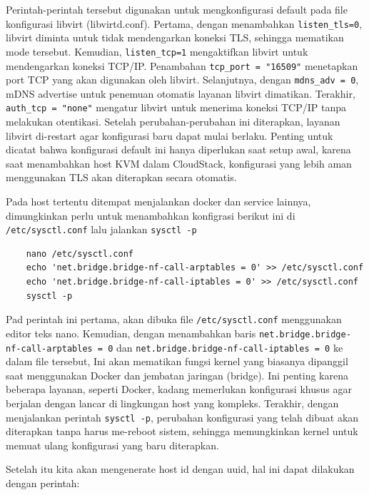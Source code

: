Perintah-perintah tersebut digunakan untuk mengkonfigurasi default pada file konfigurasi libvirt (libvirtd.conf). Pertama, dengan menambahkan \texttt{listen\_tls=0}, libvirt diminta untuk tidak mendengarkan koneksi TLS, sehingga mematikan mode tersebut. Kemudian, \texttt{listen\_tcp=1} mengaktifkan libvirt untuk mendengarkan koneksi TCP/IP. Penambahan \texttt{tcp\_port = "16509"} menetapkan port TCP yang akan digunakan oleh libvirt. Selanjutnya, dengan \texttt{mdns\_adv = 0}, mDNS advertise untuk penemuan otomatis layanan libvirt dimatikan. Terakhir, \texttt{auth\_tcp = "none"} mengatur libvirt untuk menerima koneksi TCP/IP tanpa melakukan otentikasi. Setelah perubahan-perubahan ini diterapkan, layanan libvirt di-restart agar konfigurasi baru dapat mulai berlaku. Penting untuk dicatat bahwa konfigurasi default ini hanya diperlukan saat setup awal, karena saat menambahkan host KVM dalam CloudStack, konfigurasi yang lebih aman menggunakan TLS akan diterapkan secara otomatis.

Pada host tertentu ditempat menjalankan docker dan service lainnya, dimungkinkan perlu untuk menambahkan konfigrasi berikut ini di \texttt{/etc/sysctl.conf} lalu jalankan \texttt{sysctl -p}

\begin{listing}[H]
    \begin{verbatim}
    nano /etc/sysctl.conf
    echo 'net.bridge.bridge-nf-call-arptables = 0' >> /etc/sysctl.conf
    echo 'net.bridge.bridge-nf-call-iptables = 0' >> /etc/sysctl.conf
    sysctl -p
    \end{verbatim}
\end{listing}

Pad perintah ini pertama, akan dibuka file \texttt{/etc/sysctl.conf} menggunakan editor teks nano. Kemudian, dengan menambahkan baris \texttt{net.bridge.bridge-nf-call-arptables = 0} dan \texttt{net.bridge.bridge-nf-call-iptables = 0} ke dalam file tersebut, Ini akan mematikan fungsi kernel yang biasanya dipanggil saat menggunakan Docker dan jembatan jaringan (bridge). Ini penting karena beberapa layanan, seperti Docker, kadang memerlukan konfigurasi khusus agar berjalan dengan lancar di lingkungan host yang kompleks. Terakhir, dengan menjalankan perintah \texttt{sysctl -p}, perubahan konfigurasi yang telah dibuat akan diterapkan tanpa harus me-reboot sistem, sehingga memungkinkan kernel untuk memuat ulang konfigurasi yang baru diterapkan.

Setelah itu kita akan mengenerate host id dengan uuid, hal ini dapat dilakukan dengan perintah:


